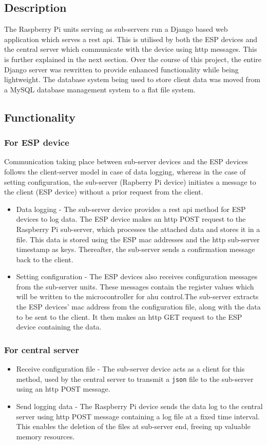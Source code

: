 \documentclass[letterpaper,11pt]{report}
\begin{document}
\subsection{Description}
The Raspberry Pi units serving as sub-servers run a Django based web application which serves a \ac{rest} \ac{api}. This is utilised by both the ESP devices and the central server which communicate with the device using \ac{http} messages. This is further explained in the next section. Over the course of this project, the entire Django server was rewritten to provide enhanced functionality while being lightweight. The database system being used to store client data was moved from a MySQL database management system to a flat file system.
\subsection{Functionality}
\subsubsection{For ESP device}
Communication taking place between sub-server devices and the ESP devices follows the client-server model in case of data logging, whereas in the case of setting configuration, the sub-server (Rapberry Pi device) initiates a message to the client (ESP device) without a prior request from the client.
\begin{itemize}
    \item Data logging - The sub-server device provides a \ac{rest} \ac{api} method for ESP devices to log data. The ESP device makes an \ac{http} POST request to the Raspberry Pi sub-server, which processes the attached data and stores it in a file. This data is stored using the ESP \ac{mac} addresses and the \ac{http} sub-server timestamp as keys. Thereafter, the sub-server sends a confirmation message back to the client.
    \item Setting configuration - The ESP devices also receives configuration messages from the sub-server units. These messages contain the register values which will be written to the microcontroller for \ac{ahu} control.\hfill \break The sub-server extracts the ESP devices' \ac{mac} address from the configuration file, along with the data to be sent to the client. It then makes an \ac{http} GET request to the ESP device containing the data.
\end{itemize}
\subsubsection{For central server}
\begin{itemize}
    \item Receive configuration file - The sub-server device acts as a client for this method, used by the central server to transmit a \verb|json| file to the sub-server using an \ac{http} POST message.
    \item Send logging data - The Raspberry Pi device sends the data log to the central server using \ac{http} POST message containing a log file at a fixed time interval. This enables the deletion of the files at sub-server end, freeing up valuable memory resources.
\end{itemize}
\end{document}
